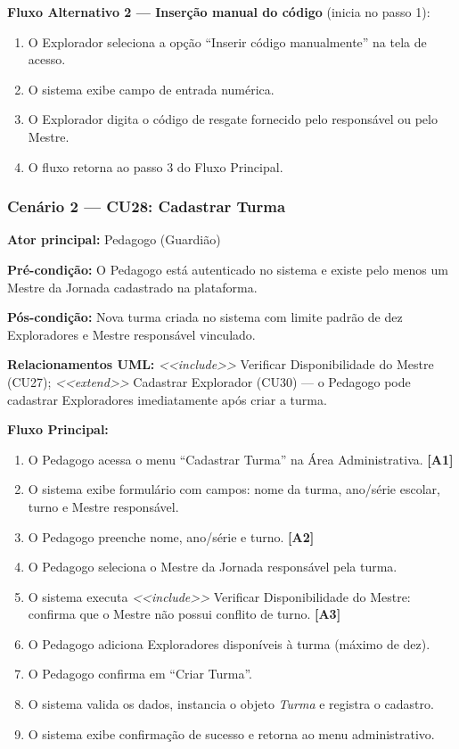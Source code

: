 \documentclass[12pt, a4paper]{article}
\begin{document}
\textbf{Fluxo Alternativo 2 --- Inserção manual do código} (inicia no passo 1):
\begin{enumerate}
    \item O Explorador seleciona a opção ``Inserir código manualmente'' na tela de acesso.
    \item O sistema exibe campo de entrada numérica.
    \item O Explorador digita o código de resgate fornecido pelo responsável ou pelo Mestre.
    \item O fluxo retorna ao passo 3 do Fluxo Principal.
\end{enumerate}

\bigskip

\subsubsection*{Cenário 2 --- CU28: Cadastrar Turma}

\noindent\textbf{Ator principal:} Pedagogo (Guardião)

\noindent\textbf{Pré-condição:} O Pedagogo está autenticado no sistema e existe pelo menos
um Mestre da Jornada cadastrado na plataforma.

\noindent\textbf{Pós-condição:} Nova turma criada no sistema com limite padrão de dez
Exploradores e Mestre responsável vinculado.

\noindent\textbf{Relacionamentos UML:} \textit{<<include>>} Verificar Disponibilidade do Mestre
(CU27); \textit{<<extend>>} Cadastrar Explorador (CU30) --- o Pedagogo pode cadastrar
Exploradores imediatamente após criar a turma.

\medskip
\textbf{Fluxo Principal:}
\begin{enumerate}
    \item O Pedagogo acessa o menu ``Cadastrar Turma'' na Área Administrativa. \textbf{[A1]}
    \item O sistema exibe formulário com campos: nome da turma, ano/série escolar, turno e Mestre responsável.
    \item O Pedagogo preenche nome, ano/série e turno. \textbf{[A2]}
    \item O Pedagogo seleciona o Mestre da Jornada responsável pela turma.
    \item O sistema executa \textit{<<include>>} Verificar Disponibilidade do Mestre: confirma que o Mestre não possui conflito de turno. \textbf{[A3]}
    \item O Pedagogo adiciona Exploradores disponíveis à turma (máximo de dez).
    \item O Pedagogo confirma em ``Criar Turma''.
    \item O sistema valida os dados, instancia o objeto \textit{Turma} e registra o cadastro.
    \item O sistema exibe confirmação de sucesso e retorna ao menu administrativo.
\end{enumerate}
\end{document}
